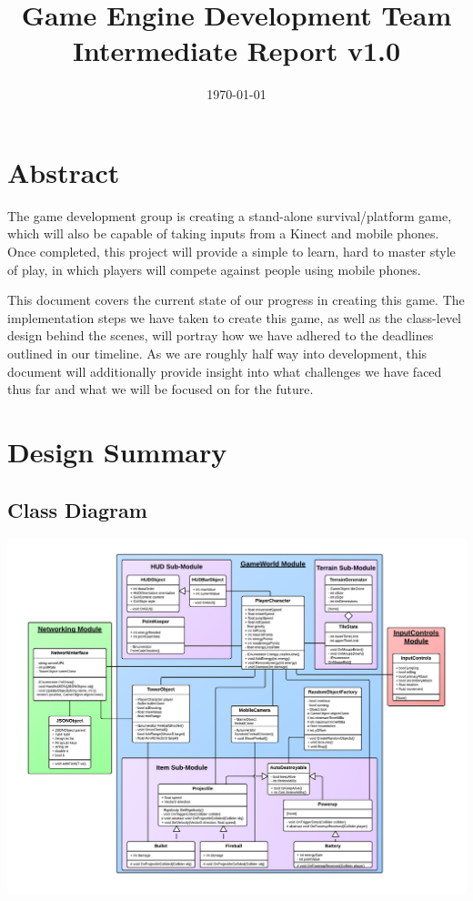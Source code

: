 \documentclass[10pt,letterpaper,oneside,english]{article}
\title{
	\textbf{Game Engine Development Team}\\
	Intermediate Report v1.0
}
\author{
	\person{Bahr}{Dan}{dbahr92@gmail.com}
	\and
	\person{Bard}{Etan}{ebard@ups.edu}
	\and
	\person{Burns}{Nick}{nbburns@ups.edu}
	\and
	\person{Livingston}{Chris}{christopherlivingston92@gmail.com}
	\and
	\person{Wilson}{Robin}{rkwilson@ups.edu}
}
\date{\today}
\begin{document}
\maketitle
\newpage

\tableofcontents
\newpage

\section{Abstract}
The game development group is creating a stand-alone survival/platform game, which will also be capable of taking inputs from a Kinect and mobile phones. Once completed, this project will provide a simple to learn, hard to master style of play, in which players will compete against people using mobile phones.

This document covers the current state of our progress in creating this game. The implementation steps we have taken to create this game, as well as the class-level design behind the scenes, will portray how we have adhered to the deadlines outlined in our timeline. As we are roughly half way into development, this document will additionally provide insight into what challenges we have faced thus far and what we will be focused on for the future.

\section{Design Summary}
\subsection{Class Diagram}
\includegraphics[scale= 0.7]{ViCharClassDiagram}
\end{document}
